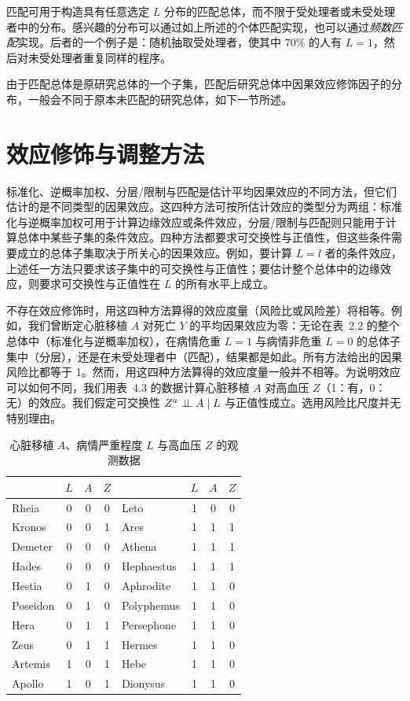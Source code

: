匹配可用于构造具有任意选定 $L$ 分布的匹配总体，而不限于受处理者或未受处理者中的分布。感兴趣的分布可以通过如上所述的个体匹配实现，也可以通过\emph{频数匹配}实现。后者的一个例子是：随机抽取受处理者，使其中 $70\%$ 的人有 $L=1$，然后对未受处理者重复同样的程序。

由于匹配总体是原研究总体的一个子集，匹配后研究总体中因果效应修饰因子的分布，一般会不同于原本未匹配的研究总体，如下一节所述。

\section{效应修饰与调整方法}

标准化、逆概率加权、分层/限制与匹配是估计平均因果效应的不同方法，但它们估计的是不同类型的因果效应。这四种方法可按所估计效应的类型分为两组：标准化与逆概率加权可用于计算边缘效应或条件效应，分层/限制与匹配则只能用于计算总体中某些子集的条件效应。四种方法都要求可交换性与正值性，但这些条件需要成立的总体子集取决于所关心的因果效应。例如，要计算 $L=l$ 者的条件效应，上述任一方法只要求该子集中的可交换性与正值性；要估计整个总体中的边缘效应，则要求可交换性与正值性在 $L$ 的所有水平上成立。

不存在效应修饰时，用这四种方法算得的效应度量（风险比或风险差）将相等。例如，我们曾断定心脏移植 $A$ 对死亡 $Y$ 的平均因果效应为零：无论在表~2.2 的整个总体中（标准化与逆概率加权），在病情危重 $L=1$ 与病情非危重 $L=0$ 的总体子集中（分层），还是在未受处理者中（匹配），结果都是如此。所有方法给出的因果风险比都等于 1。然而，用这四种方法算得的效应度量一般并不相等。为说明效应可以如何不同，我们用表~4.3 的数据计算心脏移植 $A$ 对高血压 $Z$（1：有，0：无）的效应。我们假定可交换性 $Z^a\perp\!\!\!\perp A\mid L$ 与正值性成立。选用风险比尺度并无特别理由。

\begin{table}[htbp]
\centering
\caption{心脏移植 $A$、病情严重程度 $L$ 与高血压 $Z$ 的观测数据}
\label{tab:4.3}
\small
\renewcommand{\arraystretch}{1.0}
\begin{tabular}{lccc@{\hspace{1.8em}}lccc}
\toprule
 & $L$ & $A$ & $Z$ & & $L$ & $A$ & $Z$\\
\midrule
Rheia      & 0 & 0 & 0 & Leto       & 1 & 0 & 0\\
Kronos     & 0 & 0 & 1 & Ares       & 1 & 1 & 1\\
Demeter    & 0 & 0 & 0 & Athena     & 1 & 1 & 1\\
Hades      & 0 & 0 & 0 & Hephaestus & 1 & 1 & 1\\
Hestia     & 0 & 1 & 0 & Aphrodite  & 1 & 1 & 0\\
Poseidon   & 0 & 1 & 0 & Polyphemus & 1 & 1 & 0\\
Hera       & 0 & 1 & 1 & Persephone & 1 & 1 & 0\\
Zeus       & 0 & 1 & 1 & Hermes     & 1 & 1 & 0\\
Artemis    & 1 & 0 & 1 & Hebe       & 1 & 1 & 0\\
Apollo     & 1 & 0 & 1 & Dionysus   & 1 & 1 & 0\\
\bottomrule
\end{tabular}
\end{table}

